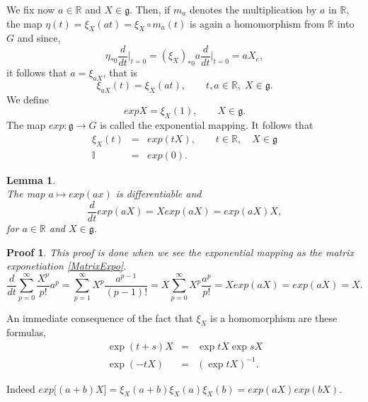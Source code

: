 \documentclass[a4paper,11pt]{article} %
\numberwithin{equation}{section} %
\numberwithin{figure}{section} %
\newtheorem{lem}{Lemma}
\newtheorem{demo}{Proof}
\begin{document}
We fix now  $a\in\mathbb{R}$ and $X\in\mathfrak{g}$. Then, if $m_a$ denotes the multiplication by $a$ in $\mathbb{R}$, the map $\eta(t)=\xi_X(a t)=\xi_X\circ m_a(t)$ is again a homomorphism from $\mathbb{R}$ into $G$ and since,
\begin{equation}
\eta_{*0}\frac{d}{dt} \big|_{t=0}=(\xi_X)_{*0}a\frac{d}{dt}\big|_{t=0}=a X_e,
\end{equation}
it follows that $a=\xi_{a X}$, that is
\begin{equation}
\xi_{a X}(t)=\xi_X(a t), \qquad t,a\in\mathbb{R},\;X\in\mathfrak{g}.
\end{equation}
We define
\begin{equation}
exp X=\xi_X(1), \qquad X\in\mathfrak{g}.
\end{equation}
The map $exp:\mathfrak{g}\rightarrow G$ is called the exponential mapping. It follows that
\begin{eqnarray}
\xi_X(t)&=&exp (tX),\qquad t\in\mathbb{R},\quad X\in\mathfrak{g} \\
\mathbb{I}&=& exp(0).
\end{eqnarray}

\begin{lem} \cite[Lem. 2.1, p.52]{Yvette2005} \\
The map $a \mapsto exp(ax)$ is differentiable and 
\begin{equation}
\frac{d}{dt} exp(aX) = X exp(aX) = exp(aX) X, 
\end{equation}
for $a\in \mathbb{R}$ and $X \in \mathfrak{g}$.
\end{lem}

\begin{demo}
This proof is done when we see the exponential mapping as the matrix exponetiation \eqref{MatrixExpo}. 
\begin{equation}
\frac{d}{dt} \sum^{\infty}_{p=0} \frac{X^p}{p!} a^p = \sum^{\infty}_{p=1} X^p \frac{a^{p-1}}{(p-1)!} = X \sum^{\infty}_{p=0} X^p \frac{a^p}{p!} = X exp(aX) = exp(aX) = X.  
\end{equation}
\end{demo}

An immediate consequence of the fact that  $\xi_X$ is a homomorphism are these formulas,
\begin{eqnarray}
 \exp (t+s)X&=&\exp tX\exp sX\\
 \exp (-tX)&=&(\exp tX)^{-1}.
\end{eqnarray}

Indeed $exp\big[ (a+b) X \big] = \xi_{X}(a+b) \xi_{X}(a) \xi_X(b) = exp(aX) exp(bX)$.
\end{document}
